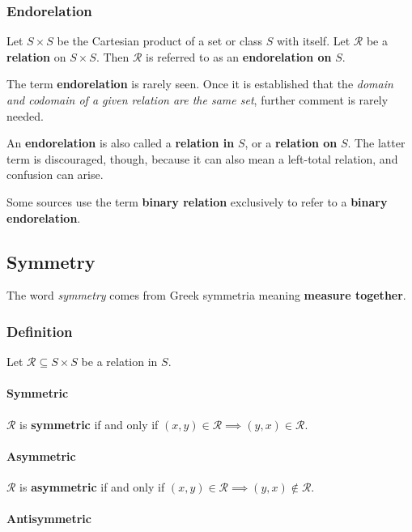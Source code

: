 \subsubsection{Endorelation}
Let $S \times S$ be the Cartesian product of a set or class $S$ with
itself. Let $\mathcal{R}$ be a \textbf{relation} on $S \times S$. Then
$\mathcal{R}$ is referred to as an \textbf{endorelation on} $S$.


The term \textbf{endorelation} is rarely seen. Once it is established
that the \textit{domain and codomain of a given relation are the same
  set}, further comment is rarely needed.


An \textbf{endorelation} is also called a \textbf{relation in} $S$, or
a \textbf{relation on} $S$. The latter term is discouraged, though,
because it can also mean a left-total relation, and confusion can
arise.

Some sources use the term \textbf{binary relation} exclusively to
refer to a \textbf{binary endorelation}.


\subsection{Symmetry}
\label{sec:symmetry}
The word \textit{symmetry} comes from Greek symmetria meaning
\textbf{measure together}.

\subsubsection{Definition}

Let $\mathcal{R} \subseteq S \times S$ be a relation in $S$.



\paragraph{Symmetric}

$\mathcal{R}$ is \textbf{symmetric} if and only if
$(x, y) \in \mathcal{R} \implies (y, x) \in \mathcal{R}$.

\paragraph{Asymmetric}

$\mathcal{R}$ is \textbf{asymmetric} if and only if
$(x, y) \in \mathcal{R} \implies (y, x) \notin \mathcal{R}$.

\paragraph{Antisymmetric}

